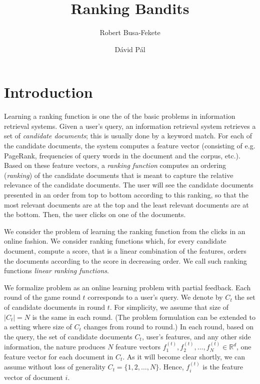 \documentclass{article}
\newcommand{\R}{\mathbb{R}}
\begin{document}
\title{Ranking Bandits}
\author{Robert Busa-Fekete \and D\'avid P\'al}
\maketitle

\section{Introduction}

Learning a ranking function is one the of the basic problems in information
retrieval systems. Given a user's query, an information retrieval system
retrieves a set of \emph{candidate documents}; this is usually done by a keyword
match. For each of the candidate documents, the system computes a feature vector
(consisting of e.g. PageRank, frequencies of query words in the document and the
corpus, etc.). Based on these feature vectors, a \emph{ranking function}
computes an ordering (\emph{ranking}) of the candidate documents that is meant
to capture the relative relevance of the candidate documents. The user will see
the candidate documents presented in an order from top to bottom according to
this ranking, so that the most relevant documents are at the top and the least
relevant documents are at the bottom. Then, the user clicks on one of the
documents.

We consider the problem of learning the ranking function from the clicks in
an online fashion. We consider ranking functions which, for every candidate
document, compute a score, that is a linear combination of the features, orders
the documents according to the score in decreasing order. We call such ranking
functions \emph{linear ranking functions}.

We formalize problem as an online learning problem with partial feedback. Each
round of the game round $t$ corresponds to a user's query. We denote by $C_t$
the set of candidate documents in round $t$. For simplicity, we assume that size
of $|C_t| = N$ is the same in each round. (The problem formulation can be
extended to a setting where size of $C_t$ changes from round to round.) In each
round, based on the query, the set of candidate documents $C_t$, user's
features, and any other side information, the nature produces $N$ feature
vectors $f_1^{(t)}, f_2^{(t)}, \dots, f_N^{(t)} \in \R^d$, one feature vector
for each document in $C_t$. As it will become clear shortly, we can assume
without loss of generality $C_t = \{1,2,\dots,N\}$. Hence, $f_i^{(t)}$ is the
feature vector of document $i$.
\end{document}
